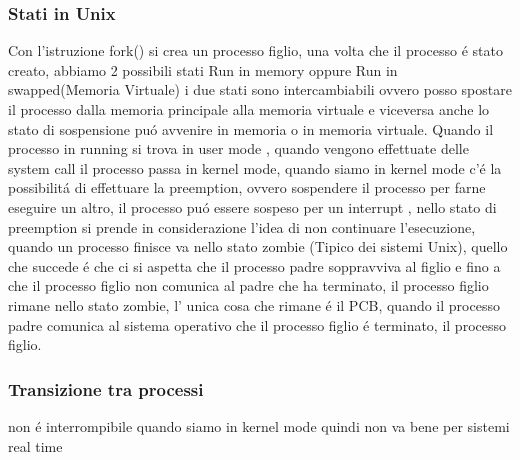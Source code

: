 \documentclass[11pt]{article}
\begin{document}
\subsubsection{Stati in Unix}
Con l'istruzione fork() si crea un processo figlio,
una volta che il processo é stato creato, abbiamo 2 possibili stati Run in memory oppure Run in swapped(Memoria Virtuale)
i due stati sono intercambiabili ovvero posso spostare il processo dalla memoria principale alla memoria virtuale e viceversa
anche lo stato di sospensione puó avvenire in memoria o in memoria virtuale. Quando il processo in running si trova in user mode
, quando vengono effettuate delle system call il processo passa in kernel mode, quando siamo in kernel mode c'é la possibilitá di
effettuare la preemption, ovvero sospendere il processo per farne eseguire un altro, il processo puó essere sospeso per un interrupt
, nello stato di preemption si prende in considerazione l'idea di non continuare l'esecuzione, quando un processo finisce va
nello stato zombie (Tipico dei sistemi Unix), quello che succede é che ci si aspetta che il processo padre soppravviva al figlio
e fino a che il processo figlio non comunica al padre che ha terminato, il processo figlio rimane nello stato zombie, l' unica cosa
che rimane é il PCB, quando il processo padre comunica al sistema operativo che il processo figlio é terminato, il processo figlio.
\subsubsection{Transizione tra processi}
non é interrompibile quando siamo in kernel mode quindi non va bene per sistemi real time
\end{document}
